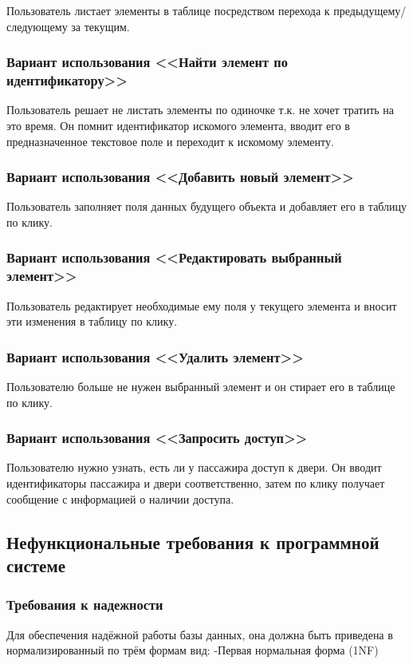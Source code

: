 Пользователь листает элементы в таблице посредством перехода к предыдущему/следующему за текущим.

\subsubsection{Вариант использования <<Найти элемент по идентификатору>>}

Пользователь решает не листать элементы по одиночке т.к. не хочет тратить на это время. Он помнит идентификатор искомого элемента, вводит его в предназначенное текстовое поле и переходит к искомому элементу.

\subsubsection{Вариант использования <<Добавить новый элемент>>}

Пользователь заполняет поля данных будущего объекта и добавляет его в таблицу по клику.

\subsubsection{Вариант использования <<Редактировать выбранный элемент>>}

Пользователь редактирует необходимые ему поля у текущего элемента и вносит эти изменения в таблицу по клику.

\subsubsection{Вариант использования <<Удалить элемент>>}

Пользователю больше не нужен выбранный элемент и он стирает его в таблице по клику.

\subsubsection{Вариант использования <<Запросить доступ>>}

Пользователю нужно узнать, есть ли у пассажира доступ к двери. Он вводит идентификаторы пассажира и двери соответственно, затем по клику получает сообщение с информацией о наличии доступа.

\subsection {Нефункциональные требования к программной системе}
\subsubsection{Требования к надежности}
Для обеспечения надёжной работы базы данных, она должна быть приведена в нормализированный по трём формам вид:
-Первая нормальная форма (1NF)

